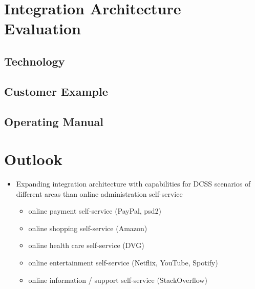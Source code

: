 \documentclass[
     12pt,         %
     a4paper,      %
     BCOR10mm,     %
     DIV14,        %
aragraph skip instad of paragraph indent
     ]{scrreprt}
\begin{document}
\chapter{Integration Architecture Evaluation}

\section{Technology}

\section{Customer Example}

\section{Operating Manual}

\chapter{Outlook}

\begin{itemize}
     \item Expanding integration architecture with capabilities for DCSS scenarios of different areas than online administration self-service
     \begin{itemize}
          \item online payment self-service (PayPal, psd2)
          \item online shopping self-service (Amazon)
          \item online health care self-service (DVG)
          \item online entertainment self-service (Netflix, YouTube, Spotify)
          \item online information / support self-service (StackOverflow)
     \end{itemize}
\end{itemize}



\end{document}
